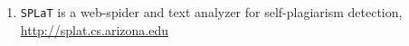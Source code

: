 \documentclass[10pt]{article}
\begin{document}
\begin{description}
\begin{enumerate}
\item {\tt SPLaT} is a web-spider and text analyzer for self-plagiarism detection, \url{http://splat.cs.arizona.edu}

\end{enumerate}

%




\end{description}
\end{document}
